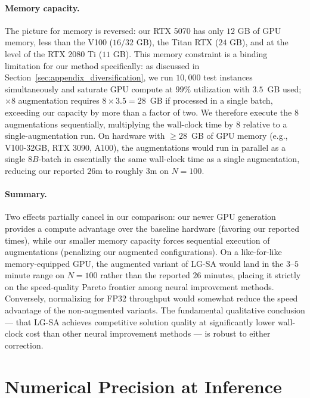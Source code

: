 \documentclass[letterpaper]{article} %
\begin{document}
\paragraph{Memory capacity.}
The picture for memory is reversed: our RTX 5070 has only $12$ GB of GPU memory, less than the V100 ($16$/$32$ GB), the Titan RTX ($24$ GB), and at the level of the RTX 2080 Ti ($11$ GB). This memory constraint is a binding limitation for our method specifically: as discussed in Section~\ref{sec:appendix_diversification}, we run $10{,}000$ test instances simultaneously and saturate GPU compute at $99\%$ utilization with $3.5$~GB used; $\times 8$ augmentation requires $8 \times 3.5 = 28$~GB if processed in a single batch, exceeding our capacity by more than a factor of two. We therefore execute the $8$ augmentations sequentially, multiplying the wall-clock time by $8$ relative to a single-augmentation run. On hardware with $\geq 28$~GB of GPU memory (e.g., V100-32GB, RTX 3090, A100), the augmentations would run in parallel as a single $8B$-batch in essentially the same wall-clock time as a single augmentation, reducing our reported $26$m to roughly $3$m on $N{=}100$.

\paragraph{Summary.}
Two effects partially cancel in our comparison: our newer GPU generation provides a compute advantage over the baseline hardware (favoring our reported times), while our smaller memory capacity forces sequential execution of augmentations (penalizing our augmented configurations). On a like-for-like memory-equipped GPU, the augmented variant of LG-SA would land in the $3$--$5$ minute range on $N{=}100$ rather than the reported $26$ minutes, placing it strictly on the speed-quality Pareto frontier among neural improvement methods. Conversely, normalizing for FP32 throughput would somewhat reduce the speed advantage of the non-augmented variants. The fundamental qualitative conclusion --- that LG-SA achieves competitive solution quality at significantly lower wall-clock cost than other neural improvement methods --- is robust to either correction.

\section{Numerical Precision at Inference}
\label{sec:appendix_precision}
\end{document}
